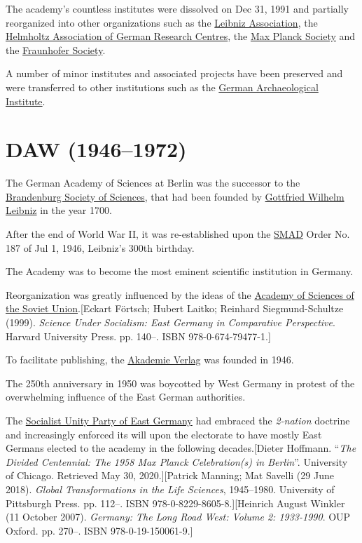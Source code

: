 \documentclass{book}
\numberwithin{equation}{section}
\begin{document}
The academy's countless institutes were dissolved on Dec 31, 1991 and partially reorganized into other organizations such as the \href{https://en.wikipedia.org/wiki/Leibniz_Association}{Leibniz Association}, the \href{https://en.wikipedia.org/wiki/Helmholtz_Association_of_German_Research_Centres}{Helmholtz Association of German Research Centres}, the \href{https://en.wikipedia.org/wiki/Max\_Planck\_Society}{Max Planck Society} and the \href{https://en.wikipedia.org/wiki/Fraunhofer_Society}{Fraunhofer Society}.

A number of minor institutes and associated projects have been preserved and were transferred to other institutions such as the \href{https://en.wikipedia.org/wiki/German_Archaeological_Institute}{German Archaeological Institute}.

\section{DAW (1946--1972)}
The German Academy of Sciences at Berlin was the successor to the \href{https://en.wikipedia.org/wiki/Brandenburg_Society_of_Sciences}{Brandenburg Society of Sciences}, that had been founded by \href{https://en.wikipedia.org/wiki/Gottfried_Wilhelm_Leibniz}{Gottfried Wilhelm Leibniz} in the year 1700.

After the end of World War II, it was re-established upon the \href{https://en.wikipedia.org/wiki/Soviet_Military_Administration_in_Germany}{SMAD} Order No. 187 of Jul 1, 1946, Leibniz's 300th birthday.

The Academy was to become the most eminent scientific institution in Germany.

Reorganization was greatly influenced by the ideas of the \href{https://en.wikipedia.org/wiki/Academy_of_Sciences_of_the_Soviet_Union}{Academy of Sciences of the Soviet Union}.[Eckart Förtsch; Hubert Laitko; Reinhard Siegmund-Schultze (1999). \textit{Science Under Socialism: East Germany in Comparative Perspective}. Harvard University Press. pp. 140--. ISBN 978-0-674-79477-1.]

%
To facilitate publishing, the \href{https://en.wikipedia.org/wiki/Akademie_Verlag}{Akademie Verlag} was founded in 1946.

The 250th anniversary in 1950 was boycotted by West Germany in protest of the overwhelming influence of the East German authorities.

The \href{https://en.wikipedia.org/wiki/Socialist_Unity_Party_of_Germany}{Socialist Unity Party of East Germany} had embraced the \textit{2-nation} doctrine and increasingly enforced its will upon the electorate to have mostly East Germans elected to the academy in the following decades.[Dieter Hoffmann. ``\textit{The Divided Centennial: The 1958 Max Planck Celebration(s) in Berlin}''. University of Chicago. Retrieved May 30, 2020.][Patrick Manning; Mat Savelli (29 June 2018). \textit{Global Transformations in the Life Sciences}, 1945--1980. University of Pittsburgh Press. pp. 112--. ISBN 978-0-8229-8605-8.][Heinrich August Winkler (11 October 2007). \textit{Germany: The Long Road West: Volume 2: 1933-1990}. OUP Oxford. pp. 270–. ISBN 978-0-19-150061-9.]
\end{document}
